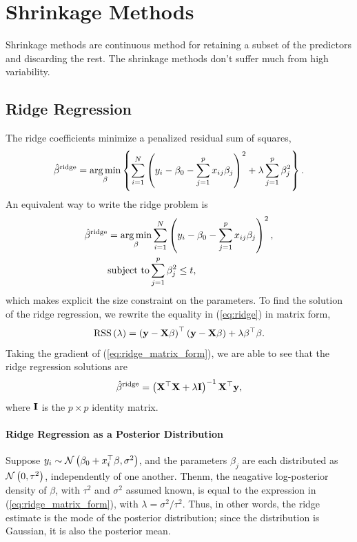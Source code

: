 \documentclass{article}
\begin{document}
\section{Shrinkage Methods}
Shrinkage methods are continuous method for retaining a subset of the predictors and discarding the rest.
The shrinkage methods don't suffer much from high variability.

\subsection{Ridge Regression}
The ridge coefficients minimize a penalized residual sum of squares,
\begin{equation}
  \label{eq:ridge}
  \hat{\beta}^\text{ridge} = \operatorname*{arg\,min}_\beta \left\{ \sum_{i=1}^{N}\left( y_i - \beta_0 - \sum_{j=1}^{p}x_{ij}\beta_j\right)^2  + \lambda \sum_{j=1}^{p}\beta_j^2\right\}.
\end{equation}
An equivalent way to write the ridge problem is
\begin{equation}
\begin{split}
  \hat{\beta}^\text{ridge} &= \operatorname*{arg\,min}_\beta \sum_{i=1}^{N}\left( y_i - \beta_0 - \sum_{j=1}^{p}x_{ij}\beta_j\right)^2, \\
  &\text{subject to} \sum_{j=1}^{p}\beta_j^2 \le t,
\end{split}
\end{equation}
which makes explicit the size constraint on the parameters. To find the solution of the ridge regression, we rewrite the equality in (\ref{eq:ridge}) in matrix form,
\begin{equation}
  \label{eq:ridge_matrix_form}
  \text{RSS}\left( \lambda \right) = \left( {\mathbf{y}} - {\mathbf{X}} \beta \right)^\top \left( {\mathbf{y}} - {\mathbf{X}} \beta \right) + \lambda \beta^\top \beta. 
\end{equation}
Taking the gradient of (\ref{eq:ridge_matrix_form}), we are able to see that the ridge regression solutions are
\begin{equation}
  \label{eq:ridge_solution}
  \hat{\beta}^\text{ridge} = \left( {\mathbf{X}}^\top {\mathbf{X}} + \lambda {\mathbf{I}} \right)^{-1} {\mathbf{X}}^\top {\mathbf{y}},
\end{equation}
where ${\mathbf{I}}$ is the $p \times p$ identity matrix.

\paragraph{Ridge Regression as a Posterior Distribution} Suppose $y_i \sim \mathcal{N}\left( \beta_0 +x_i^\top \beta, \sigma^2 \right)$, and the parameters $\beta_j$ are each distributed as $\mathcal{N}\left( 0,\tau^2 \right)$, independently of one another. Thenm, the neagative log-posterior density of $\beta$, with $\tau^2$ and $\sigma^2$ assumed known, is equal to the expression in (\ref{eq:ridge_matrix_form}), with $\lambda = \sigma^2/\tau^2$. Thus, in other words, the ridge estimate is the mode of the posterior distribution; since the distribution is Gaussian, it is also the posterior mean.
\end{document}
